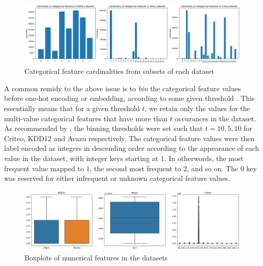 \documentclass{mldsmsc}
\begin{document}
\begin{figure}[h]
    \centering
    \includegraphics[width=\textwidth]{../figures/dataset_cardinalities.png}
    \caption{Categorical feature cardinalities from subsets of each dataset}
    \label{fig:cardinalities}
\end{figure}

A common remidy to the above issue is to \emph{bin} the categorical feature 
values before one-hot encoding or embedding, according to some given 
threshold \citep{RefWorks:song2019autoint}. This essentially means that for a 
given threshold $t$, we retain only the values for the multi-value 
categorical features that have more than $t$ occurances in the dataset. As recommended by
\cite{RefWorks:song2019autoint}, the binning thresholds were set such that
$t = {10,5,10}$ for Criteo, KDD12 and Avazu respectively. The categorical
feature values were then label encoded as integers in descending order according
to the appearance of each value in the dataset, with integer keys starting
at $1$. In otherwords, the most frequent value mapped to $1$, the second most frequent
to $2$, and so on. The $0$ key was reserved for either infrequent or unknown categorical
feature values.

\begin{figure}[h]
    \centering
    \includegraphics[width=\textwidth]{../figures/numerical_boxplots.png}
    \caption{Boxplots of numerical features in the datasets}
    \label{fig:boxplots}
\end{figure}
\end{document}
